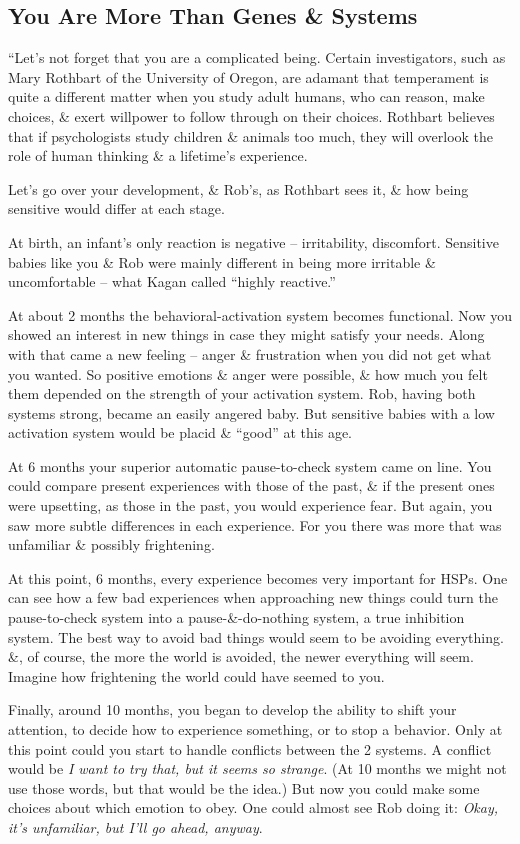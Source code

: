 \documentclass{article}
\numberwithin{equation}{section}
\begin{document}
\subsection{You Are More Than Genes \& Systems}
``Let's not forget that you are a complicated being. Certain investigators, such as Mary Rothbart of the University of Oregon, are adamant that temperament is quite a different matter when you study adult humans, who can reason, make choices, \& exert willpower to follow through on their choices. Rothbart believes that if psychologists study children \& animals too much, they will overlook the role of human thinking \& a lifetime's experience.

Let's go over your development, \& Rob's, as Rothbart sees it, \& how being sensitive would differ at each stage.

At birth, an infant's only reaction is negative -- irritability, discomfort. Sensitive babies like you \& Rob were mainly different in being more irritable \& uncomfortable -- what Kagan called ``highly reactive.''

At about 2 months the behavioral-activation system becomes functional. Now you showed an interest in new things in case they might satisfy your needs. Along with that came a new feeling -- anger \& frustration when you did not get what you wanted. So positive emotions \& anger were possible, \& how much you felt them depended on the strength of your activation system. Rob, having both systems strong, became an easily angered baby. But sensitive babies with a low activation system would be placid \& ``good'' at this age.

At 6 months your superior automatic pause-to-check system came on line. You could compare present experiences with those of the past, \& if the present ones were upsetting, as those in the past, you would experience fear. But again, you saw more subtle differences in each experience. For you there was more that was unfamiliar \& possibly frightening.

At this point, 6 months, every experience becomes very important for HSPs. One can see how a few bad experiences when approaching new things could turn the pause-to-check system into a pause-\&-do-nothing system, a true inhibition system. The best way to avoid bad things would seem to be avoiding everything. \&, of course, the more the world is avoided, the newer everything will seem. Imagine how frightening the world could have seemed to you.

Finally, around 10 months, you began to develop the ability to shift your attention, to decide how to experience something, or to stop a behavior. Only at this point could you start to handle conflicts between the 2 systems. A conflict would be \textit{I want to try that, but it seems so strange}. (At 10 months we might not use those words, but that would be the idea.) But now you could make some choices about which emotion to obey. One could almost see Rob doing it: \textit{Okay, it's unfamiliar, but I'll go ahead, anyway}.
\end{document}
